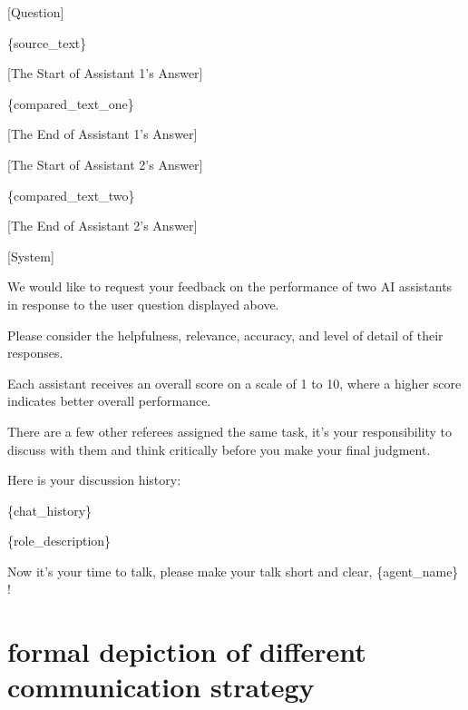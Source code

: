 \begin{table}[hbpt!]

\begin{tcolorbox}

{

[Question]

\textcolor[rgb]{0,0,0.9}{\{source\_text\}}

[The Start of Assistant 1’s Answer]

\textcolor[rgb]{0,0,0.9}{\{compared\_text\_one\}}

[The End of Assistant 1’s Answer]

[The Start of Assistant 2’s Answer]

\textcolor[rgb]{0,0,0.9}{\{compared\_text\_two\}}

[The End of Assistant 2’s Answer]

[System]

We would like to request your feedback on the performance of two AI assistants in response to the user question displayed above.

Please consider the helpfulness, relevance, accuracy, and level of detail of their responses.

Each assistant receives an overall score on a scale of 1 to 10, where a higher score indicates better overall performance.

There are a few other referees assigned the same task, it's your responsibility to discuss with them and think critically before you make your final judgment.

Here is your discussion history:

\textcolor[rgb]{0,0,0.9}{\{chat\_history\}}

\textcolor[rgb]{0,0,0.9}{\{role\_description\}}

Now it's your time to talk, please make your talk short and clear,
\textcolor[rgb]{0,0,0.9}{\{agent\_name\}} !
}
\end{tcolorbox}
\caption{The prompt template for FairEval Dataset. We replace the colored slot with real text before querying the LLMs. Note that we use the same template when conducting single-agent-based experiments and ignore the chat history and role description slot.  }
\label{tab:prompt_template}
\end{table}




\section{formal depiction of different communication strategy}
\label{appendix:algorithm}


